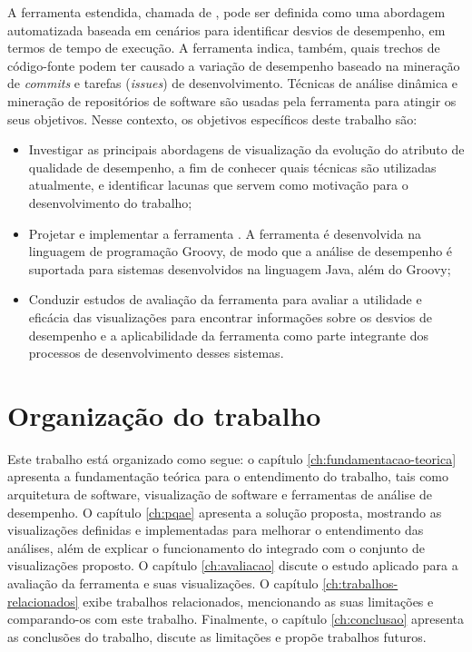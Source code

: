 A ferramenta estendida, chamada de \textit{\perfMinerName} \cite{Pinto2015}, pode ser definida como uma abordagem automatizada baseada em cenários para identificar desvios de desempenho, em termos de tempo de execução. A ferramenta indica, também, quais trechos de código-fonte podem ter causado a variação de desempenho baseado na mineração de \textit{commits} e tarefas (\textit{issues}) de desenvolvimento. Técnicas de análise dinâmica e mineração de repositórios de software são usadas pela ferramenta para atingir os seus objetivos. Nesse contexto, os objetivos específicos deste trabalho são:
\begin{itemize}
	\item Investigar as principais abordagens de visualização da evolução do atributo de qualidade de desempenho, a fim de conhecer quais técnicas são utilizadas atualmente, e identificar lacunas que servem como motivação para o desenvolvimento do trabalho;
	\item Projetar e implementar a ferramenta \textit{{\toolName}}. A ferramenta é desenvolvida na linguagem de programação Groovy, de modo que a análise de desempenho é suportada para sistemas desenvolvidos na linguagem Java, além do Groovy;
	\item Conduzir estudos de avaliação da ferramenta para avaliar a utilidade e eficácia das visualizações para encontrar informações sobre os desvios de desempenho e a aplicabilidade da ferramenta como parte integrante dos processos de desenvolvimento desses sistemas.
\end{itemize}

\section{Organização do trabalho} \label{sec:organizacao-trabalho}

Este trabalho está organizado como segue: o capítulo \ref{ch:fundamentacao-teorica} apresenta a fundamentação teórica para o entendimento do trabalho, tais como arquitetura de software, visualização de software e ferramentas de análise de desempenho. O capítulo \ref{ch:pqae} apresenta a solução proposta, mostrando as visualizações definidas e implementadas para melhorar o entendimento das análises, além de explicar o funcionamento do \textit{\perfMinerName} integrado com o conjunto de visualizações proposto. O capítulo \ref{ch:avaliacao} discute o estudo aplicado para a avaliação da ferramenta e suas visualizações. O capítulo \ref{ch:trabalhos-relacionados} exibe trabalhos relacionados, mencionando as suas limitações e comparando-os com este trabalho. Finalmente, o capítulo \ref{ch:conclusao} apresenta as conclusões do trabalho, discute as limitações e propõe trabalhos futuros.